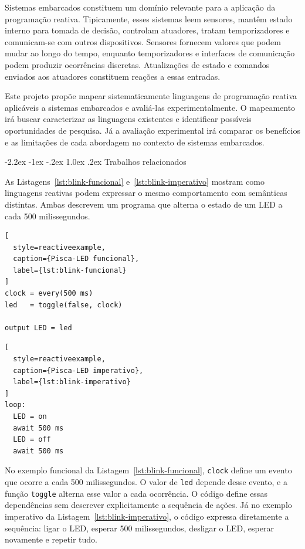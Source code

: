 \documentclass[12pt,a4paper]{article}
\makeatletter
\renewcommand\section{\@startsection{section}{1}{\z@}%
  {-2.2ex \@plus -1ex \@minus -.2ex}%
  {1.0ex \@plus .2ex}%
  {\normalfont\bfseries}}
\makeatother
\begin{document}
Sistemas embarcados constituem um domínio relevante para a aplicação da programação reativa.
Tipicamente, esses sistemas leem sensores, mantêm estado interno para tomada de decisão,
controlam atuadores, tratam temporizadores e comunicam-se com outros dispositivos.
Sensores fornecem valores que podem mudar ao longo do tempo,
enquanto temporizadores e interfaces de comunicação podem produzir ocorrências discretas.
Atualizações de estado e comandos enviados aos atuadores constituem reações a essas entradas.

Este projeto propõe mapear sistematicamente linguagens de programação reativa aplicáveis a sistemas embarcados e avaliá-las experimentalmente.
O mapeamento irá buscar caracterizar as linguagens existentes e identificar possíveis oportunidades de pesquisa.
Já a avaliação experimental irá comparar os benefícios e as limitações de cada abordagem no contexto de sistemas embarcados.

\section{Trabalhos relacionados}

As Listagens~\ref{lst:blink-funcional} e~\ref{lst:blink-imperativo} mostram como linguagens reativas
podem expressar o mesmo comportamento com semânticas distintas.
Ambas descrevem um programa que alterna o estado de um LED a cada 500 milissegundos.

\noindent
\begin{minipage}[t]{0.48\textwidth}
\begin{lstlisting}[
  style=reactiveexample,
  caption={Pisca-LED funcional},
  label={lst:blink-funcional}
]
clock = every(500 ms)
led   = toggle(false, clock)

output LED = led
\end{lstlisting}
\end{minipage}\hfill
\begin{minipage}[t]{0.48\textwidth}
\begin{lstlisting}[
  style=reactiveexample,
  caption={Pisca-LED imperativo},
  label={lst:blink-imperativo}
]
loop:
  LED = on
  await 500 ms
  LED = off
  await 500 ms
\end{lstlisting}
\end{minipage}

No exemplo funcional da Listagem~\ref{lst:blink-funcional}, \texttt{clock} define um evento que ocorre a cada 500 milissegundos.
O valor de \texttt{led} depende desse evento, e a função \texttt{toggle} alterna esse valor a cada ocorrência.
O código define essas dependências sem descrever explicitamente a sequência de ações.
Já no exemplo imperativo da Listagem~\ref{lst:blink-imperativo},
o código expressa diretamente a sequência: ligar o LED, esperar 500 milissegundos, desligar o LED, esperar novamente e repetir tudo.
\end{document}
